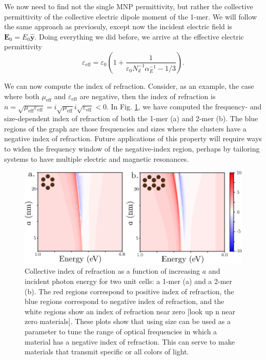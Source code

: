 \documentclass [11pt, proquest] {uwthesis}[2016/11/22]
\begin{document}
We now need to find not the single MNP permittivity, but rather the collective permittivity of the collective electric dipole moment of the 1-mer. We will follow the same approach as previosuly, except now the incident electric field is $\textbf{E}_0 = E_0\hat{\textbf{y}}$. Doing everything we did before, we arrive at the effective electric permittivity
\begin{equation}
\varepsilon_{\textrm{eff}} = \varepsilon_0\left(1+\frac{1}{\varepsilon_0N_d^{-1}\alpha_E^{-1}-1/3}\right).
\label{eps_eff}
\end{equation}

We can now compute the index of refraction. Consider, as an example, the case where both $\mu_{\textrm{eff}}$ and $\varepsilon_{\textrm{eff}}$ are negative, then the index of refraction is $n = \sqrt{\mu_{\textrm{eff}}\varepsilon_{\textrm{eff}}} = i\sqrt{\mu_{\textrm{eff}}}i\sqrt{\varepsilon_{\textrm{eff}}} < 0$. In Fig. \ref{n_plot}, we have computed the frequency- and size-dependent index of refraction of both the 1-mer (a) and 2-mer (b). The blue regions of the graph are those frequencies and sizes where the clusters have a negative index of refraction. Future applications of this property will require ways to widen the frequency window of the negative-index region, perhaps by tailoring systems to have multiple electric and magnetic resonances.


\begin{figure}
\begin{centering}
\includegraphics{contour_n_plot.pdf}
\caption{Collective index of refraction as a function of increasing $a$ and incident photon energy for two unit cells: a 1-mer (a) and a 2-mer (b). The red regions correspond to positive index of refraction, the blue regions correspond to negative index of refraction, and the white regions show an index of refraction near zero [look up n near zero materials]. These plots show that using size can be used as a parameter to tune the range of optical frequencies in which a material has a negative index of refraction. This can serve to make materials that transmit specific or all colors of light.}
\label{n_plot}
\end{centering}
\end{figure}

%
%


%
\end{document}
